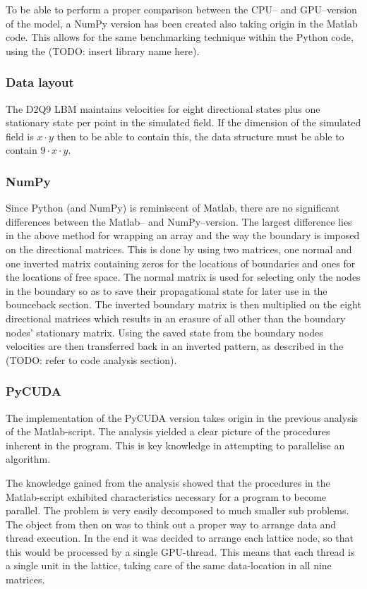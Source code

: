 To be able to perform a proper comparison between the CPU-- and GPU--version of the model, a NumPy version has been created also taking origin in the Matlab code. This allows for the same benchmarking technique within the Python code, using the (TODO: insert library name here).

\subsubsection{Data layout}
The D2Q9 LBM maintains velocities for eight directional states plus one stationary state per point in the simulated field. If the dimension of the simulated field is $x \cdot y$ then to be able to contain this, the data structure must be able to contain $9 \cdot x \cdot y$.

\subsubsection{NumPy}
Since Python (and NumPy) is reminiscent of Matlab, there are no significant differences between the Matlab-- and NumPy--version. The largest difference lies in the above method for wrapping an array and the way the boundary is imposed on the directional matrices. This is done by using two matrices, one normal and one inverted matrix containing zeros for the locations of boundaries and ones for the locations of free space. The normal matrix is used for selecting only the nodes in the boundary so as to save their propagational state for later use in the bounceback section. The inverted boundary matrix is then multiplied on the eight directional matrices which results in an erasure of all other than the boundary nodes' stationary matrix. Using the saved state from the boundary nodes velocities are then transferred back in an inverted pattern, as described in the (TODO: refer to code analysis section).

\subsubsection{PyCUDA}
The implementation of the PyCUDA version takes origin in the previous analysis of the Matlab-script. The analysis yielded a clear picture of the procedures inherent in the program. This is key knowledge in attempting to parallelise an algorithm.

The knowledge gained from the analysis showed that the procedures in the Matlab-script exhibited characteristics necessary for a program to become parallel. The problem is very easily decomposed to much smaller sub problems. The object from then on was to think out a proper way to arrange data and thread execution. In the end it was decided to arrange each lattice node, so that this would be processed by a single GPU-thread. This means that each thread is a single unit in the lattice, taking care of the same data-location in all nine matrices.

